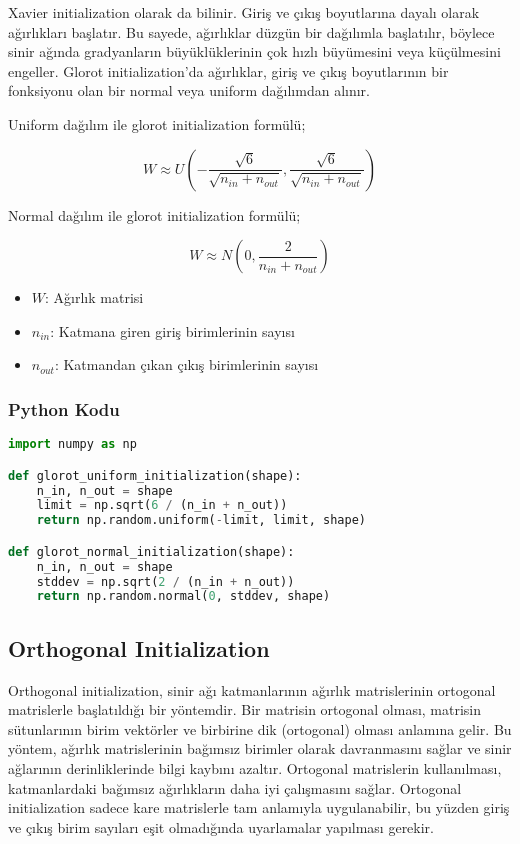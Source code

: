 Xavier initialization olarak da bilinir. Giriş ve çıkış boyutlarına dayalı olarak ağırlıkları başlatır. Bu sayede, ağırlıklar düzgün bir dağılımla başlatılır, böylece sinir ağında gradyanların büyüklüklerinin çok hızlı büyümesini veya küçülmesini engeller. Glorot initialization'da ağırlıklar, giriş ve çıkış boyutlarının bir fonksiyonu olan bir normal veya uniform dağılımdan alınır.

Uniform dağılım ile glorot initialization formülü;

\[ W \approx U (-\frac{\sqrt{6}}{\sqrt{n_{in} + n_{out}}}, \frac{\sqrt{6}}{\sqrt{n_{in} + n_{out}}}) \]

Normal dağılım ile glorot initialization formülü;

\[ W \approx N (0, \frac{2}{n_{in} + n_{out}}) \]

\begin{itemize}
    \item $W$: Ağırlık matrisi
    \item $n_{in}$: Katmana giren giriş birimlerinin sayısı
    \item $n_{out}$: Katmandan çıkan çıkış birimlerinin sayısı
\end{itemize}

\subsubsection{Python Kodu}

\begin{lstlisting}[language=Python]
import numpy as np

def glorot_uniform_initialization(shape):
    n_in, n_out = shape
    limit = np.sqrt(6 / (n_in + n_out))
    return np.random.uniform(-limit, limit, shape)

def glorot_normal_initialization(shape):
    n_in, n_out = shape
    stddev = np.sqrt(2 / (n_in + n_out))
    return np.random.normal(0, stddev, shape)
\end{lstlisting}

\newpage

\subsection{Orthogonal Initialization}

Orthogonal initialization, sinir ağı katmanlarının ağırlık matrislerinin ortogonal matrislerle başlatıldığı bir yöntemdir. Bir matrisin ortogonal olması, matrisin sütunlarının birim vektörler ve birbirine dik (ortogonal) olması anlamına gelir. Bu yöntem, ağırlık matrislerinin bağımsız birimler olarak davranmasını sağlar ve sinir ağlarının derinliklerinde bilgi kaybını azaltır. Ortogonal matrislerin kullanılması, katmanlardaki bağımsız ağırlıkların daha iyi çalışmasını sağlar. Ortogonal initialization sadece kare matrislerle tam anlamıyla uygulanabilir, bu yüzden giriş ve çıkış birim sayıları eşit olmadığında uyarlamalar yapılması gerekir.

